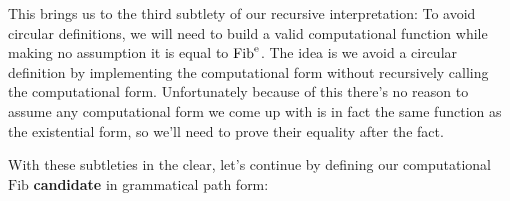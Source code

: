 \documentclass[twoside]{article}
\newcommand{\supst}[1]{\ensuremath{^{\mbox{\scriptsize #1}}}}
\newcommand{\strong}[1]{{\bfseries #1}}
\begin{document}
This brings us to the third subtlety of our recursive interpretation: To avoid circular definitions, we will need
to build a valid computational function while making no assumption it is equal to $ \mbox{Fib}\supst{e} $. The idea
is we avoid a circular definition by implementing the computational form without recursively calling the computational
form. Unfortunately because of this there's no reason to assume any computational form we come up with is in fact
the same function as the existential form, so we'll need to prove their equality after the fact.

With these subtleties in the clear, let's continue by defining our
computational $ \mbox{Fib} $ \strong{candidate} in grammatical path form:

\end{document}
